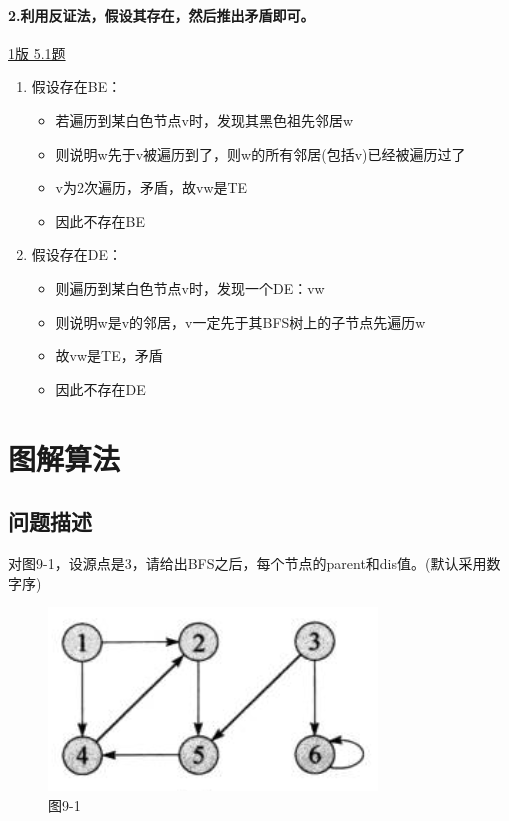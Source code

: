 \documentclass{article}
\begin{document}
\paragraph{2.利用反证法，假设其存在，然后推出矛盾即可。}

\href{https://github.com/Shannju/njucser_helphelp/blob/main/Algorithm%E7%AE%97%E6%B3%95/%E7%AD%94%E6%A1%88/%E7%AE%97%E6%B3%95%E7%AD%94%E6%A1%88csdn%EF%BC%88%E5%8A%A9%E6%95%99%E5%B7%B2%E5%88%A0%E9%99%A4.pdf}{1版 5.1题}

\begin{enumerate}
    \item 假设存在BE：
    \begin{itemize}
        \item 若遍历到某白色节点v时，发现其黑色祖先邻居w
        \item 则说明w先于v被遍历到了，则w的所有邻居(包括v)已经被遍历过了
        \item v为2次遍历，矛盾，故vw是TE
        \item 因此不存在BE
    \end{itemize}
    
    \item 假设存在DE：
    \begin{itemize}
        \item 则遍历到某白色节点v时，发现一个DE：vw
        \item 则说明w是v的邻居，v一定先于其BFS树上的子节点先遍历w
        \item 故vw是TE，矛盾
        \item 因此不存在DE
    \end{itemize}
\end{enumerate}

\pagebreak
\section{图解算法}
\subsection{问题描述}

对图9-1，设源点是3，请给出BFS之后，每个节点的parent和dis值。(默认采用数字序)

\begin{figure}[h]
    \centering
    \includegraphics[width=0.5\linewidth]{Figure/9-1.png}
    \caption{图9-1}
    \label{fig:9-1 raw}
\end{figure}
\end{document}
